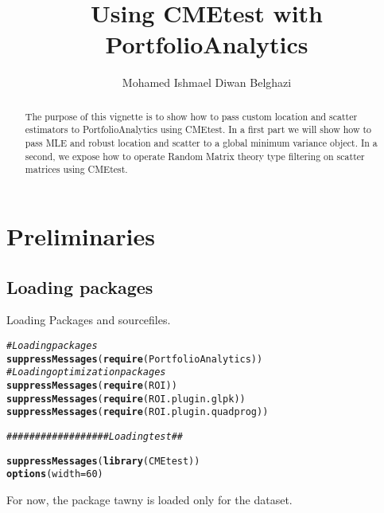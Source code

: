 \documentclass[12pt,letterpaper,english]{article}\usepackage[]{graphicx}\usepackage[]{color}
\makeatletter
\newcommand{\hlnum}[1]{\textcolor[rgb]{0.686,0.059,0.569}{#1}}%
\newcommand{\hlcom}[1]{\textcolor[rgb]{0.678,0.584,0.686}{\textit{#1}}}%
\newcommand{\hlstd}[1]{\textcolor[rgb]{0.345,0.345,0.345}{#1}}%
\newcommand{\hlkwc}[1]{\textcolor[rgb]{0.333,0.667,0.333}{#1}}%
\newcommand{\hlkwd}[1]{\textcolor[rgb]{0.737,0.353,0.396}{\textbf{#1}}}%
\newenvironment{kframe}{%
 \def\at@end@of@kframe{}%
 \ifinner\ifhmode%
  \def\at@end@of@kframe{\end{minipage}}%
  \begin{minipage}{\columnwidth}%
 \fi\fi%
 \def\FrameCommand##1{\hskip\@totalleftmargin \hskip-\fboxsep
 \colorbox{shadecolor}{##1}\hskip-\fboxsep
     \hskip-\linewidth \hskip-\@totalleftmargin \hskip\columnwidth}%
 \MakeFramed {\advance\hsize-\width
   \@totalleftmargin\z@ \linewidth\hsize
   \@setminipage}}%
 {\par\unskip\endMakeFramed%
 \at@end@of@kframe}
\newenvironment{knitrout}{}{} %
\makeatother
\begin{document}
\title{Using CMEtest with PortfolioAnalytics}
\author{Mohamed Ishmael Diwan Belghazi}

\maketitle

\begin{abstract}
The purpose of this vignette is to show how to pass custom location and scatter estimators to PortfolioAnalytics using CMEtest. In a first part we will show how to pass MLE and robust location and scatter to a global minimum variance object. In a second, we expose how to operate Random Matrix theory type filtering on scatter matrices using CMEtest.
\end{abstract}

\tableofcontents

\section{Preliminaries}
\subsection{Loading packages}
Loading Packages and sourcefiles. 
\begin{knitrout}
\color{fgcolor}\begin{kframe}
\begin{alltt}
\hlcom{# Loading packages}
\hlkwd{suppressMessages}\hlstd{(}\hlkwd{require}\hlstd{(PortfolioAnalytics))}
\hlcom{# Loading optimization packages}
\hlkwd{suppressMessages}\hlstd{(}\hlkwd{require}\hlstd{(ROI))}
\hlkwd{suppressMessages}\hlstd{(}\hlkwd{require}\hlstd{(ROI.plugin.glpk))}
\hlkwd{suppressMessages}\hlstd{(}\hlkwd{require}\hlstd{(ROI.plugin.quadprog))}

\hlcom{################## Loading test ##}

\hlkwd{suppressMessages}\hlstd{(}\hlkwd{library}\hlstd{(CMEtest))}
\hlkwd{options}\hlstd{(}\hlkwc{width} \hlstd{=} \hlnum{60}\hlstd{)}
\end{alltt}
\end{kframe}
\end{knitrout}

For now, the package tawny is loaded only for the dataset.
\end{document}
